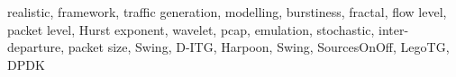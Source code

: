 realistic, framework, traffic generation, modelling, burstiness, fractal, flow level, packet level, Hurst exponent, wavelet, pcap, emulation, stochastic, inter-departure, packet size, Swing, D-ITG, Harpoon, Swing, SourcesOnOff, LegoTG, DPDK